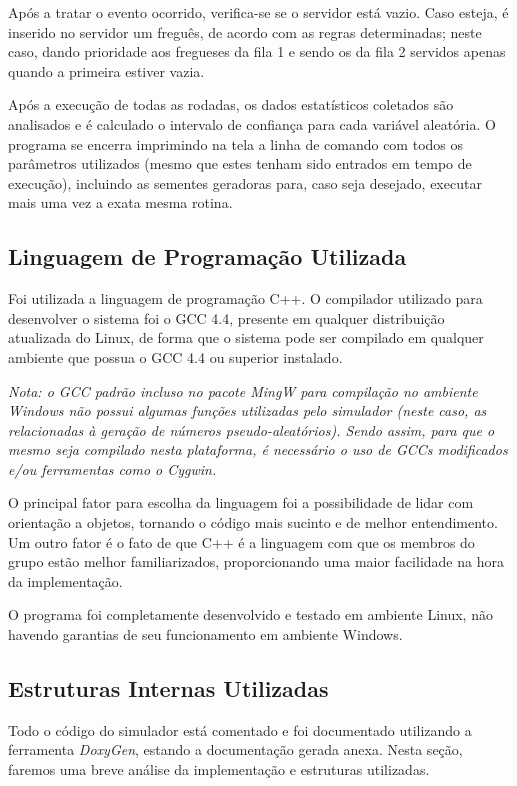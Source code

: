 \documentclass[a4paper,10pt]{article}
\begin{document}
    Após a tratar o evento ocorrido, verifica-se se o servidor está vazio. Caso esteja, é inserido no servidor um freguês, de acordo com as regras determinadas; neste caso, dando prioridade aos fregueses da fila 1 e sendo os da fila 2 servidos apenas quando a primeira estiver vazia.

    Após a execução de todas as rodadas, os dados estatísticos coletados são analisados e é calculado o intervalo de confiança para cada variável aleatória. O programa se encerra imprimindo na tela a linha de comando com todos os parâmetros utilizados (mesmo que estes tenham sido entrados em tempo de execução), incluindo as sementes geradoras para, caso seja desejado, executar mais uma vez a exata mesma rotina.

\subsection{Linguagem de Programação Utilizada}

    Foi utilizada a linguagem de programação C++. O compilador utilizado para desenvolver o sistema foi o GCC 4.4, presente em qualquer distribuição atualizada do Linux, de forma que o sistema pode ser compilado em qualquer ambiente que possua o GCC 4.4 ou superior instalado.

\emph{Nota: o GCC padrão incluso no pacote MingW para compilação no ambiente Windows não possui algumas funções utilizadas pelo simulador (neste caso, as relacionadas à geração de números pseudo-aleatórios). Sendo assim, para que o mesmo seja compilado nesta plataforma, é necessário o uso de GCCs modificados e/ou ferramentas como o Cygwin.}

    O principal fator para escolha da linguagem foi a possibilidade de lidar com orientação a objetos, tornando o código mais sucinto e de melhor entendimento. Um outro fator é o fato de que C++ é a linguagem com que os membros do grupo estão melhor familiarizados, proporcionando uma maior facilidade na hora da implementação.

    O programa foi completamente desenvolvido e testado em ambiente Linux, não havendo garantias de seu funcionamento em ambiente Windows.

\subsection{Estruturas Internas Utilizadas}

    Todo o código do simulador está comentado e foi documentado utilizando a ferramenta \emph{DoxyGen}, estando a documentação gerada anexa. Nesta seção, faremos uma breve análise da implementação e estruturas utilizadas.
\end{document}
